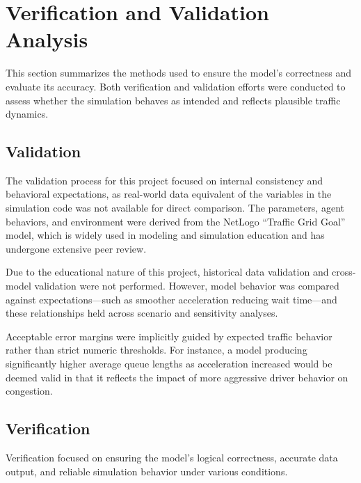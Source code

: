 \documentclass[12pt]{article}
\begin{document}
\newpage
\section{Verification and Validation Analysis}

This section summarizes the methods used to ensure the model’s correctness and evaluate its accuracy. Both verification and validation efforts were conducted to assess whether the simulation behaves as intended and reflects plausible traffic dynamics.

\subsection{Validation}

The validation process for this project focused on internal consistency and behavioral expectations, as real-world data equivalent of the variables in the simulation code was not available for direct comparison. The parameters, agent behaviors, and environment were derived from the NetLogo “Traffic Grid Goal” model, which is widely used in modeling and simulation education and has undergone extensive peer review.

Due to the educational nature of this project, historical data validation and cross-model validation were not performed. However, model behavior was compared against expectations—such as smoother acceleration reducing wait time—and these relationships held across scenario and sensitivity analyses.

Acceptable error margins were implicitly guided by expected traffic behavior rather than strict numeric thresholds. For instance, a model producing significantly higher average queue lengths as acceleration increased would be deemed valid in that it reflects the impact of more aggressive driver behavior on congestion.

\subsection{Verification}

Verification focused on ensuring the model’s logical correctness, accurate data output, and reliable simulation behavior under various conditions.
\end{document}
